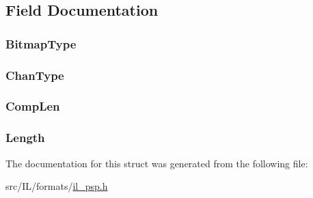 \subsection{Field Documentation}
\hypertarget{struct_c_h_a_n_n_e_l___c_h_u_n_k_a20cdfbd91909040f376c934cbf801c0b}{
\subsubsection[{Bitmap\-Type}]{ Bitmap\-Type}}\label{struct_c_h_a_n_n_e_l___c_h_u_n_k_a20cdfbd91909040f376c934cbf801c0b}
\hypertarget{struct_c_h_a_n_n_e_l___c_h_u_n_k_a35cf121b38b7eb818c3a662802ac29b7}{
\subsubsection[{Chan\-Type}]{ Chan\-Type}}\label{struct_c_h_a_n_n_e_l___c_h_u_n_k_a35cf121b38b7eb818c3a662802ac29b7}
\hypertarget{struct_c_h_a_n_n_e_l___c_h_u_n_k_a73df60c17832e4c88c7e827c78d09838}{
\subsubsection[{Comp\-Len}]{ Comp\-Len}}\label{struct_c_h_a_n_n_e_l___c_h_u_n_k_a73df60c17832e4c88c7e827c78d09838}
\hypertarget{struct_c_h_a_n_n_e_l___c_h_u_n_k_a3ed5d34564fb19b1d2884d37b6143e6a}{
\subsubsection[{Length}]{ Length}}\label{struct_c_h_a_n_n_e_l___c_h_u_n_k_a3ed5d34564fb19b1d2884d37b6143e6a}


The documentation for this struct was generated from the following file\-:\begin{DoxyCompactItemize}
\item 
src/\-I\-L/formats/\hyperlink{il__psp_8h}{il\-\_\-psp.\-h}\end{DoxyCompactItemize}
